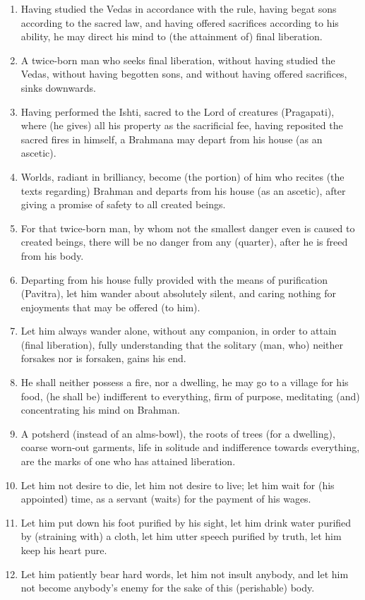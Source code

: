 \begin{enumerate}
\item Having studied the Vedas in accordance with the rule, having begat sons according to the sacred law, and having offered sacrifices according to his ability, he may direct his mind to (the attainment of) final liberation.
\item A twice-born man who seeks final liberation, without having studied the Vedas, without having begotten sons, and without having offered sacrifices, sinks downwards.
\item Having performed the Ishti, sacred to the Lord of creatures (Pragapati), where (he gives) all his property as the sacrificial fee, having reposited the sacred fires in himself, a Brahmana may depart from his house (as an ascetic).
\item Worlds, radiant in brilliancy, become (the portion) of him who recites (the texts regarding) Brahman and departs from his house (as an ascetic), after giving a promise of safety to all created beings.
\item For that twice-born man, by whom not the smallest danger even is caused to created beings, there will be no danger from any (quarter), after he is freed from his body.
\item Departing from his house fully provided with the means of purification (Pavitra), let him wander about absolutely silent, and caring nothing for enjoyments that may be offered (to him).
\item Let him always wander alone, without any companion, in order to attain (final liberation), fully understanding that the solitary (man, who) neither forsakes nor is forsaken, gains his end.
\item He shall neither possess a fire, nor a dwelling, he may go to a village for his food, (he shall be) indifferent to everything, firm of purpose, meditating (and) concentrating his mind on Brahman.
\item A potsherd (instead of an alms-bowl), the roots of trees (for a dwelling), coarse worn-out garments, life in solitude and indifference towards everything, are the marks of one who has attained liberation.
\item Let him not desire to die, let him not desire to live; let him wait for (his appointed) time, as a servant (waits) for the payment of his wages.
\item Let him put down his foot purified by his sight, let him drink water purified by (straining with) a cloth, let him utter speech purified by truth, let him keep his heart pure.
\item Let him patiently bear hard words, let him not insult anybody, and let him not become anybody's enemy for the sake of this (perishable) body.

\end{enumerate}
